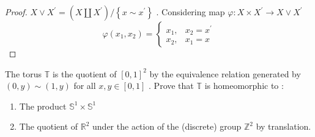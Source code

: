 \documentclass[../main.tex]{subfiles}
\begin{document}
\begin{proof}
    \(  X\vee X^{\prime} = \left( X \coprod  X^{\prime}  \right)/ \left\{ x\sim x^{\prime}  \right\}   \) . Considering map \(   \varphi : X\times X^{\prime}  \to X\vee  X^{\prime}   \) \[
     \varphi \left( x_1,x_2 \right)=\begin{cases} x_1,& x_2= x^{\prime} \\ 
      x_2,&x_1= x \end{cases} 
    \] 
\end{proof}

\begin{problem}{}{}
    The torus  \(  \mathbb{T}  \)  is the quotient of \(  \left[ 0,1 \right]^{2}   \)  by the equivalence relation generated by \(  \left( 0,y \right)\sim \left( 1,y \right)    \) for all \(  x,y \in \left[ 0,1 \right]   \) . Prove that \(  \mathbb{T}  \) is homeomorphic to : 
    \begin{enumerate}
        \item The product \(  \mathbb{S}^{1}\times \mathbb{S}^{1}  \) 
        \item The quotient of \(  \mathbb{R} ^{2}  \)  under the action of the (discrete) group \(  \mathbb{Z}^{2}  \) by translation. 
    \end{enumerate}
      
\end{problem}
\end{document}
